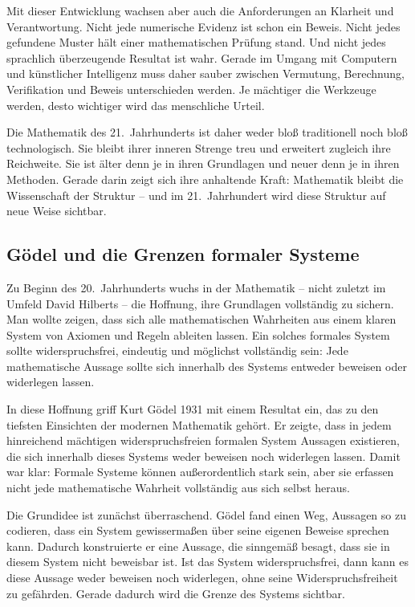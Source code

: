 Mit dieser Entwicklung wachsen aber auch die Anforderungen an Klarheit und Verantwortung. Nicht jede numerische Evidenz ist schon ein Beweis. Nicht jedes gefundene Muster hält einer mathematischen Prüfung stand. Und nicht jedes sprachlich überzeugende Resultat ist wahr. Gerade im Umgang mit Computern und künstlicher Intelligenz muss daher sauber zwischen Vermutung, Berechnung, Verifikation und Beweis unterschieden werden. Je mächtiger die Werkzeuge werden, desto wichtiger wird das menschliche Urteil.

Die Mathematik des 21.~Jahrhunderts ist daher weder bloß traditionell noch bloß technologisch. Sie bleibt ihrer inneren Strenge treu und erweitert zugleich ihre Reichweite. Sie ist älter denn je in ihren Grundlagen und neuer denn je in ihren Methoden. Gerade darin zeigt sich ihre anhaltende Kraft: Mathematik bleibt die Wissenschaft der Struktur -- und im 21.~Jahrhundert wird diese Struktur auf neue Weise sichtbar.


\subsection{Gödel und die Grenzen formaler Systeme}

Zu Beginn des 20.~Jahrhunderts wuchs in der Mathematik -- nicht zuletzt im Umfeld David Hilberts -- die Hoffnung, ihre Grundlagen vollständig zu sichern. Man wollte zeigen, dass sich alle mathematischen Wahrheiten aus einem klaren System von Axiomen und Regeln ableiten lassen. Ein solches formales System sollte widerspruchsfrei, eindeutig und möglichst vollständig sein: Jede mathematische Aussage sollte sich innerhalb des Systems entweder beweisen oder widerlegen lassen.

In diese Hoffnung griff Kurt Gödel 1931 mit einem Resultat ein, das zu den tiefsten Einsichten der modernen Mathematik gehört. Er zeigte, dass in jedem hinreichend mächtigen widerspruchsfreien formalen System Aussagen existieren, die sich innerhalb dieses Systems weder beweisen noch widerlegen lassen. Damit war klar: Formale Systeme können außerordentlich stark sein, aber sie erfassen nicht jede mathematische Wahrheit vollständig aus sich selbst heraus.

Die Grundidee ist zunächst überraschend. Gödel fand einen Weg, Aussagen so zu codieren, dass ein System gewissermaßen über seine eigenen Beweise sprechen kann. Dadurch konstruierte er eine Aussage, die sinngemäß besagt, dass sie in diesem System nicht beweisbar ist. Ist das System widerspruchsfrei, dann kann es diese Aussage weder beweisen noch widerlegen, ohne seine Widerspruchsfreiheit zu gefährden. Gerade dadurch wird die Grenze des Systems sichtbar.

